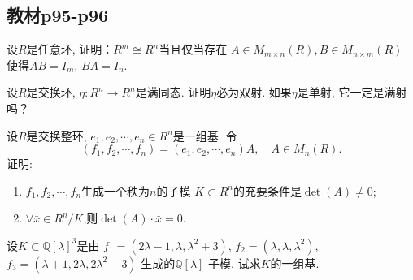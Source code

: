 \subsection{教材p95-p96}

\begin{problem}
    设$R$是任意环, 证明：$R^m \cong R^n$当且仅当存在
$A \in M_{m \times n}(R), B \in M_{n \times m}(R)$
使得$AB = I_m$, $BA = I_{n}$.
\end{problem}

\begin{solution}
    
\end{solution}

\begin{problem}
    设$R$是交换环, $\eta:R^n \to R^n$是满同态.
证明$\eta$必为双射. 如果$\eta$是单射, 它一定是满射吗？
\end{problem}

\begin{solution}
    
\end{solution}

\begin{problem}
    设$R$是交换整环, $e_1, e_2, \cdots, e_n \in R^n$是一组基.
令
\[
    (f_1, f_2, \cdots, f_n) = (e_1, e_2, \cdots, e_n)A,\quad A \in M_n(R).
\]
证明:
\begin{enumerate}[(1)]
    \item $f_1, f_2, \cdots, f_n$生成一个秩为$n$的子模
$K \subset R^n$的充要条件是$\det(A) \neq 0$;
    \item $\forall \bar{x} \in R^{n}/K$,则$\det(A) \cdot \bar{x} = 0$.
\end{enumerate}
\end{problem}

\begin{solution}
    
\end{solution}

\begin{problem}
    设$K \subset \mathbb{Q}[\lambda]^3$是由
$f_1 = (2\lambda - 1, \lambda, \lambda^2 + 3)$,
$f_2 = (\lambda, \lambda, \lambda^2)$,
$f_3 = (\lambda + 1, 2\lambda, 2\lambda^2 - 3)$
生成的$\mathbb{Q}[\lambda]$-子模. 试求$K$的一组基.
\end{problem}

\begin{solution}
    
\end{solution}

